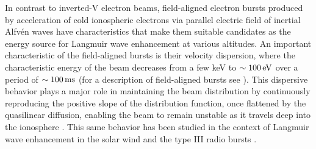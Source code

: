 In contrast to inverted-V electron beams, field-aligned electron bursts produced by acceleration of cold ionospheric electrons via parallel electric field of inertial Alfvén waves \citep{kletzing2001,semeter2008} have characteristics that make them suitable candidates as the energy source for Langmuir wave enhancement at various altitudes. 
An important characteristic of the field-aligned bursts is their velocity dispersion, where the characteristic energy of the beam decreases from a few keV to $\sim\unit[100]{eV}$ over a period of $\sim \unit[100]{ms}$ (for a description of field-aligned bursts see \citet{mcfadden1987}). 
This dispersive behavior plays a major role in maintaining the beam distribution by continuously reproducing the positive slope of the distribution function, once flattened by the quasilinear diffusion, enabling the beam to remain unstable as it travels deep into the ionosphere \citep{ergun1993,sanbonmatsu2001}. 
This same behavior has been studied in the context of Langmuir wave enhancement in the solar wind and the type III radio bursts \citep{muschietti1990}. 

